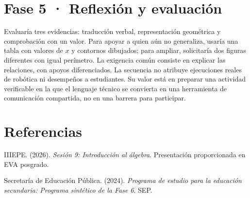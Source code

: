 \documentclass[spanish,letterpaper,oneside]{article}
\begin{document}
\section{Fase 5 · Reflexión y evaluación}
Evaluaría tres evidencias: traducción verbal, representación geométrica y comprobación con un valor. Para apoyar a quien aún no generaliza, usaría una tabla con valores de $x$ y contornos dibujados; para ampliar, solicitaría dos figuras diferentes con igual perímetro. La exigencia común consiste en explicar las relaciones, con apoyos diferenciados.
La secuencia no atribuye ejecuciones reales de robótica ni desempeños a estudiantes. Su valor está en preparar una actividad verificable en la que el lenguaje técnico se convierta en una herramienta de comunicación compartida, no en una barrera para participar.

\section*{Referencias}
{\setlength{\parskip}{6pt}
\par\hangindent=1.27cm  IIIEPE. (2026). \textit{Sesión 9: Introducción al álgebra}. Presentación proporcionada en EVA posgrado.
\par\hangindent=1.27cm  Secretaría de Educación Pública. (2024). \textit{Programa de estudio para la educación secundaria: Programa sintético de la Fase 6}. SEP.
}
\end{document}
